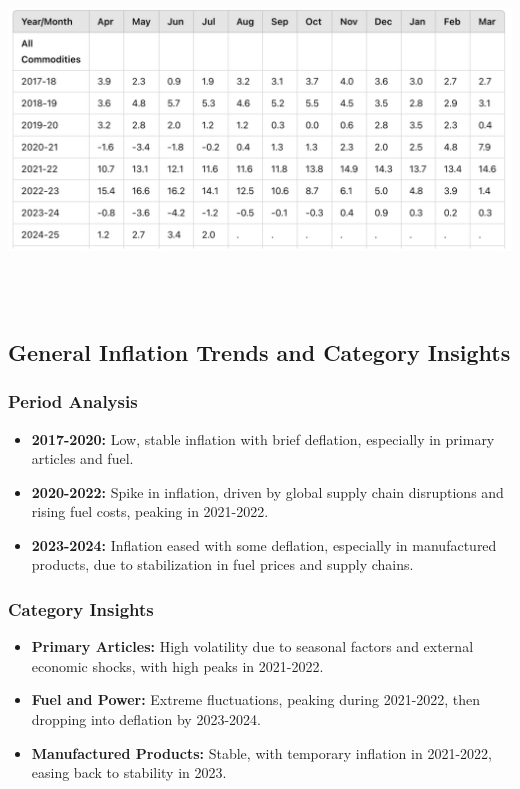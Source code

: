 \documentclass[a4paper,12pt]{extarticle} %
\begin{document}
\\
\begin{center}
    \includegraphics[width=1\textwidth]{Q5/4.png} 
\end{center}\\

\\











\subsection{General Inflation Trends and Category Insights}
\subsubsection{Period Analysis}
\begin{itemize}
    \item \textbf{2017-2020:} Low, stable inflation with brief deflation, especially in primary articles and fuel.
    \item \textbf{2020-2022:} Spike in inflation, driven by global supply chain disruptions and rising fuel costs, peaking in 2021-2022.
    \item \textbf{2023-2024:} Inflation eased with some deflation, especially in manufactured products, due to stabilization in fuel prices and supply chains.
\end{itemize}

\subsubsection{Category Insights}
\begin{itemize}
    \item \textbf{Primary Articles:} High volatility due to seasonal factors and external economic shocks, with high peaks in 2021-2022.
    \item \textbf{Fuel and Power:} Extreme fluctuations, peaking during 2021-2022, then dropping into deflation by 2023-2024.
    \item \textbf{Manufactured Products:} Stable, with temporary inflation in 2021-2022, easing back to stability in 2023.
\end{itemize}
\end{document}
